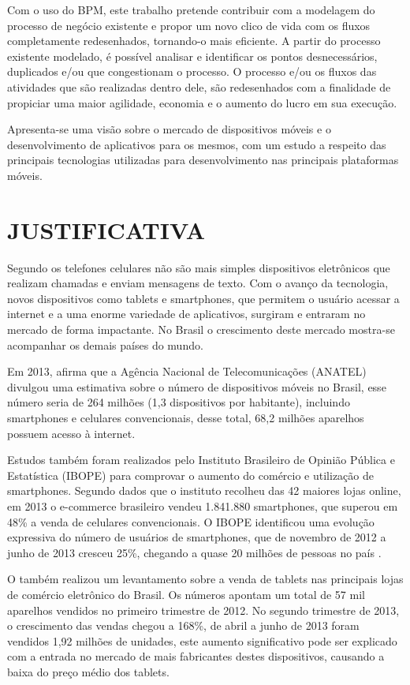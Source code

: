 \documentclass[
	12pt,				%
	openright,			%
	oneside,			%
	a4paper,			%
	chapter=TITLE,		%
	section=TITLE,		%
	english,			%
	french,				%
	spanish,			%
	brazil				%
	]{abntex2}
\begin{document}
Com o uso do BPM, este trabalho pretende contribuir com a modelagem do processo de negócio existente e propor um novo clico de vida com os fluxos completamente redesenhados, tornando-o mais eficiente. A partir do processo existente modelado, é possível analisar e identificar os pontos desnecessários, duplicados e/ou que congestionam o processo. O processo e/ou os fluxos das atividades que são realizadas dentro dele, são redesenhados com a finalidade de propiciar uma maior agilidade, economia e o aumento do lucro em sua execução.

Apresenta-se uma visão sobre o mercado de dispositivos móveis e o desenvolvimento de aplicativos para os mesmos, com um estudo a respeito das principais tecnologias utilizadas para desenvolvimento nas principais plataformas móveis.


\section{JUSTIFICATIVA}

Segundo  os telefones celulares não são mais simples dispositivos eletrônicos que realizam chamadas e enviam mensagens de texto. Com o avanço da tecnologia, novos dispositivos como tablets e smartphones, que permitem o usuário acessar a internet e a uma enorme variedade de aplicativos, surgiram e entraram no mercado de forma impactante. No Brasil o crescimento deste mercado mostra-se acompanhar os demais países do mundo. 

Em 2013,  afirma que a Agência Nacional de Telecomunicações (ANATEL) divulgou uma estimativa sobre o número de dispositivos móveis no Brasil, esse número seria de 264 milhões (1,3 dispositivos por habitante), incluindo smartphones e celulares convencionais, desse total, 68,2 milhões aparelhos possuem acesso à internet.

Estudos também foram realizados pelo Instituto Brasileiro de Opinião Pública e Estatística (IBOPE) para comprovar o aumento do comércio e utilização de smartphones. Segundo dados que o instituto recolheu das 42 maiores lojas online, em 2013 o e-commerce brasileiro vendeu 1.841.880 smartphones, que superou em 48\% a venda de celulares convencionais. O IBOPE identificou uma evolução expressiva do número de usuários de smartphones, que de novembro de 2012 a junho de 2013 cresceu 25\%, chegando a quase 20 milhões de pessoas no país \cite{ibopeMobileEcommerce}.

O  também realizou um levantamento sobre a venda de tablets nas principais lojas de comércio eletrônico do Brasil. Os números apontam um total de 57 mil aparelhos vendidos no primeiro trimestre de 2012. No segundo trimestre de 2013, o crescimento das vendas chegou a 168\%, de abril a junho de 2013 foram vendidos 1,92 milhões de unidades, este aumento significativo pode ser explicado com a entrada no mercado de mais fabricantes destes dispositivos, causando a baixa do preço médio dos tablets.
\end{document}

